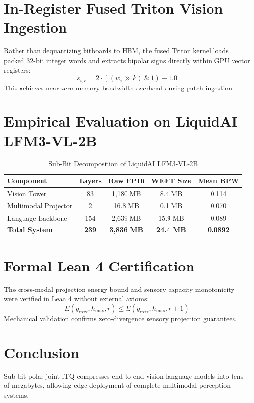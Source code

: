 \documentclass[10pt,journal,compsoc]{IEEEtran}
\begin{document}
\section{In-Register Fused Triton Vision Ingestion}
Rather than dequantizing bitboards to HBM, the fused Triton kernel loads packed 32-bit integer words and extracts bipolar signs directly within GPU vector registers:
\begin{equation}
s_{i,k} = 2 \cdot \left( (w_{i} \gg k) \ \& \ 1 \right) - 1.0
\end{equation}
This achieves near-zero memory bandwidth overhead during patch ingestion.

\section{Empirical Evaluation on LiquidAI LFM3-VL-2B}
\begin{table}[h]
\caption{Sub-Bit Decomposition of LiquidAI LFM3-VL-2B}
\centering
\begin{tabular}{lcccc}
\toprule
\textbf{Component} & \textbf{Layers} & \textbf{Raw FP16} & \textbf{WEFT Size} & \textbf{Mean BPW} \\
\midrule
Vision Tower & 83 & 1,180 MB & 8.4 MB & 0.114 \\
Multimodal Projector & 2 & 16.8 MB & 0.1 MB & 0.070 \\
Language Backbone & 154 & 2,639 MB & 15.9 MB & 0.089 \\
\midrule
\textbf{Total System} & \textbf{239} & \textbf{3,836 MB} & \textbf{24.4 MB} & \textbf{0.0892} \\
\bottomrule
\end{tabular}
\end{table}

\section{Formal Lean 4 Certification}
The cross-modal projection energy bound and sensory capacity monotonicity were verified in Lean 4 without external axioms:
\begin{equation}
E(g_{\max}, h_{\max}, r) \le E(g_{\max}, h_{\max}, r + 1)
\end{equation}
Mechanical validation confirms zero-divergence sensory projection guarantees.

\section{Conclusion}
Sub-bit polar joint-ITQ compresses end-to-end vision-language models into tens of megabytes, allowing edge deployment of complete multimodal perception systems.
\end{document}
